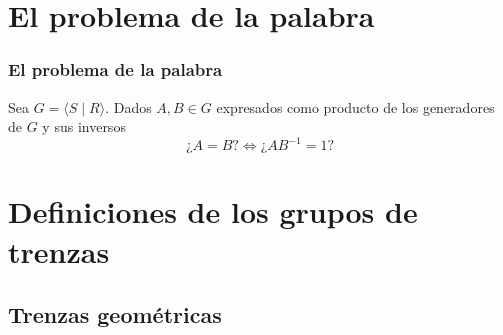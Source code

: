 \documentclass{beamer}
\theoremstyle{definition}
\providecommand{\gene}[1]{\langle{#1}\rangle}
\begin{document}
%
%
%

\section{El problema de la palabra}

\begin{frame}
\frametitle{El problema de la palabra}
Sea $G=\gene{S\mid R}$. Dados $A,B\in G$ expresados como producto de los generadores de $G$ y sus inversos
\[
\mbox{¿}A=B?\Leftrightarrow \mbox{¿}AB^{-1}=1?
\]
\end{frame}

\section{Definiciones de los grupos de trenzas}

\subsection{Trenzas geométricas}
\end{document}
